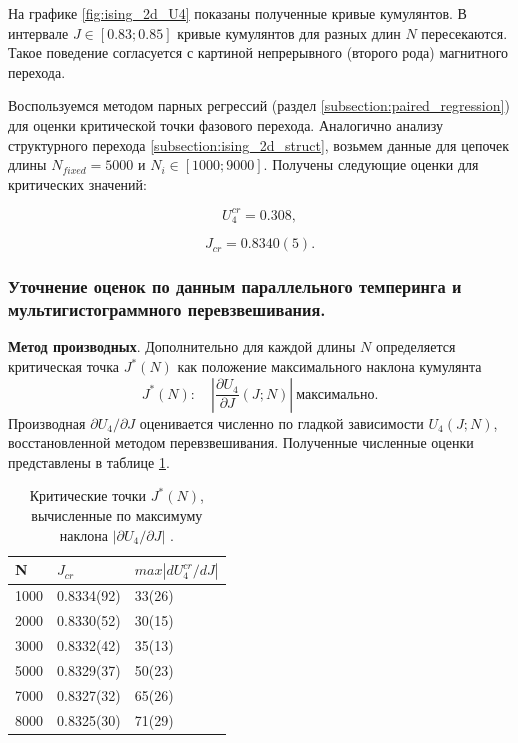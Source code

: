  На графике  \ref{fig:ising_2d_U4}  показаны полученные кривые кумулянтов. В интервале $J \in [0.83; 0.85]$ кривые кумулянтов для разных длин $N$ пересекаются. Такое поведение согласуется с картиной
 непрерывного (второго рода) магнитного перехода. 
  
  Воспользуемся методом парных регрессий (раздел \ref{subsection:paired_regression})  для оценки критической точки фазового перехода. Аналогично анализу структурного перехода \ref{subsection:ising_2d_struct}, возьмем данные для цепочек длины $N_{fixed}=5000$ и $N_i \in [1000; 9000]$. Получены следующие оценки для критических значений: 
  
   \begin{equation}
  	\label{Ising_2d_U4_cr} 
  	 U^{cr}_4	=  0.308,
  \end{equation}  
 
  \begin{equation}
  	\label{Ising_2d_J_cr} 
  J_{cr}	= 0.8340(5). 
  \end{equation}  
   
   \subsubsection{Уточнение оценок по данным параллельного темперинга и мультигистограммного перевзвешивания.} 
    
    
    \textbf{Метод производных}. 
    Дополнительно для каждой длины $N$ определяется  критическая точка $J^*(N)$ как положение максимального наклона кумулянта
    \begin{equation}
    	J^*(N):\quad \left|\frac{\partial U_4}{\partial J}(J;N)\right|\ \text{максимально}.
    \end{equation}
    Производная $\partial U_4/\partial J$ оценивается численно по гладкой зависимости $U_4(J;N)$, восстановленной методом перевзвешивания. 
    Полученные численные оценки представлены в таблице \ref{tab:binder_derivative_points}. 
 

   \begin{table}
   	\caption{Критические точки $J^*(N)$, вычисленные по максимуму наклона $|\partial U_4/\partial J|$ .}
   	 	\centering 
   	\label{tab:binder_derivative_points}
   	\begin{tabular}{lll}
   		\toprule
   		N & $J_{cr}$ & $max|dU^{cr}_4/dJ| $\\
   		\midrule
1000 & 0.8334(92) & 33(26) \\
2000 & 0.8330(52) & 30(15) \\
3000 & 0.8332(42) & 35(13) \\
5000 & 0.8329(37) & 50(23) \\
7000 & 0.8327(32) & 65(26) \\
8000 & 0.8325(30) & 71(29) \\
   		\bottomrule
   	\end{tabular}
   \end{table}
   
